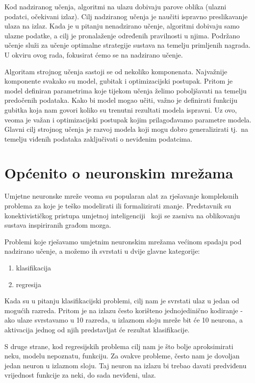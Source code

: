 \documentclass[times, utf8, zavrsni, numeric]{fer}
\begin{document}
Kod nadziranog učenja, algoritmi na ulazu dobivaju parove oblika (ulazni podatci, očekivani izlaz). Cilj nadziranog učenja je naučiti ispravno preslikavanje ulaza na izlaz.
Kada je u pitanju nenadzirano učenje, algoritmi dobivaju samo ulazne podatke, a cilj je pronalaženje određenih pravilnosti u njima.
Podržano učenje služi za učenje optimalne strategije sustava na temelju primljenih nagrada. %
U okviru ovog rada, fokusirat ćemo se na nadzirano učenje.

Algoritam strojnog učenja sastoji se od nekoliko komponenata. Najvažnije komponente svakako su model, gubitak i optimizacijski postupak.
Pritom je model definiran parametrima koje tijekom učenja želimo poboljšavati na temelju predočenih podataka. 
Kako bi model mogao učiti, važno je definirati funkciju gubitka koja nam govori koliko su trenutni rezultati modela ispravni.
Uz ovo, veoma je važan i optimizacijski postupak kojim prilagođavamo parametre modela. 
Glavni cilj strojnog učenja je razvoj modela koji mogu dobro generalizirati tj.\ na temelju viđenih podataka zaključivati o neviđenim podatcima.

\section{Općenito o neuronskim mrežama}
Umjetne neuronske mreže veoma su popularan alat za rješavanje kompleksnih problema za koje je teško modelirati ili formalizirati znanje. 
Predstavnik su konektivističkog pristupa umjetnoj inteligenciji~\cite{uui2020} koji se zasniva na oblikovanju sustava inspiriranih građom mozga.

Problemi koje rješavamo umjetnim neuronskim mrežama većinom spadaju pod nadzirano učenje, a možemo ih svrstati u dvije glavne kategorije:
\begin{enumerate}
    \item klasifikacija 
    \item regresija
\end{enumerate}

Kada su u pitanju klasifikacijski problemi, cilj nam je svrstati ulaz u jedan od mogućih razreda. 
Pritom je na izlazu često korišteno jednojedinično kodiranje - ako ulaze svrstavamo u 10 razreda, u izlaznom sloju mreže bit će 10 neurona, a aktivacija jednog od njih predstavljat će rezultat klasifikacije.

S druge strane, kod regresijskih problema cilj nam je što bolje aproksimirati neku, modelu nepoznatu, funkciju. Za ovakve probleme, često nam je dovoljan jedan neuron u izlaznom sloju. 
Taj neuron na izlazu bi trebao davati predviđenu vrijednost funkcije za neki, do sada neviđeni, ulaz.
\end{document}
